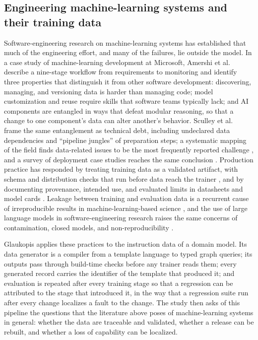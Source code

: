 \documentclass[twocolumn]{svjour3}
\begin{document}
\subsection{Engineering machine-learning systems and their training data}\label{sec:bg-se}
Software-engineering research on machine-learning systems has established that much of the engineering effort, and many of the failures, lie outside the model. In a case study of machine-learning development at Microsoft, Amershi et al.~\cite{amershi2019se4ml} describe a nine-stage workflow from requirements to monitoring and identify three properties that distinguish it from other software development: discovering, managing, and versioning data is harder than managing code; model customization and reuse require skills that software teams typically lack; and AI components are entangled in ways that defeat modular reasoning, so that a change to one component's data can alter another's behavior. Sculley et al.~\cite{sculley2015hidden} frame the same entanglement as technical debt, including undeclared data dependencies and ``pipeline jungles'' of preparation steps; a systematic mapping of the field finds data-related issues to be the most frequently reported challenge \cite{martinez2022se4ai}, and a survey of deployment case studies reaches the same conclusion \cite{paleyes2022challenges}. Production practice has responded by treating training data as a validated artifact, with schema and distribution checks that run before data reach the trainer \cite{breck2019datavalidation}, and by documenting provenance, intended use, and evaluated limits in datasheets and model cards \cite{gebru2021datasheets,mitchell2019modelcards}. Leakage between training and evaluation data is a recurrent cause of irreproducible results in machine-learning-based science \cite{kapoor2023leakage}, and the use of large language models in software-engineering research raises the same concerns of contamination, closed models, and non-reproducibility \cite{sallou2024breaking}.

Glaukopis applies these practices to the instruction data of a domain model. Its data generator is a compiler from a template language to typed graph queries; its outputs pass through build-time checks before any trainer reads them; every generated record carries the identifier of the template that produced it; and evaluation is repeated after every training stage so that a regression can be attributed to the stage that introduced it, in the way that a regression suite run after every change localizes a fault to the change. The study then asks of this pipeline the questions that the literature above poses of machine-learning systems in general: whether the data are traceable and validated, whether a release can be rebuilt, and whether a loss of capability can be localized.
\end{document}
